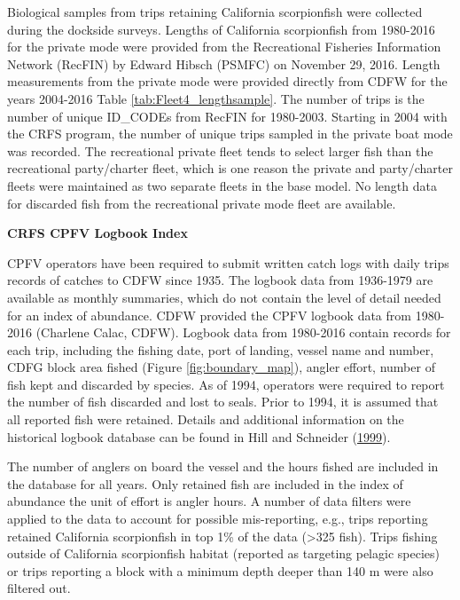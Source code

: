 \documentclass[12pt,]{article}
\begin{document}
Biological samples from trips retaining California scorpionfish were
collected during the dockside surveys. Lengths of California
scorpionfish from 1980-2016 for the private mode were provided from the
Recreational Fisheries Information Network (RecFIN) by Edward Hibsch
(PSMFC) on November 29, 2016. Length measurements from the private mode
were provided directly from CDFW for the years 2004-2016 Table
\ref{tab:Fleet4_lengthsample}. The number of trips is the number of
unique ID\_CODEs from RecFIN for 1980-2003. Starting in 2004 with the
CRFS program, the number of unique trips sampled in the private boat
mode was recorded. The recreational private fleet tends to select larger
fish than the recreational party/charter fleet, which is one reason the
private and party/charter fleets were maintained as two separate fleets
in the base model. No length data for discarded fish from the
recreational private mode fleet are available.

\textbf{CRFS CPFV Logbook Index}

CPFV operators have been required to submit written catch logs with
daily trips records of catches to CDFW since 1935. The logbook data from
1936-1979 are available as monthly summaries, which do not contain the
level of detail needed for an index of abundance. CDFW provided the CPFV
logbook data from 1980-2016 (Charlene Calac, CDFW). Logbook data from
1980-2016 contain records for each trip, including the fishing date,
port of landing, vessel name and number, CDFG block area fished (Figure
\ref{fig:boundary_map}), angler effort, number of fish kept and
discarded by species. As of 1994, operators were required to report the
number of fish discarded and lost to seals. Prior to 1994, it is assumed
that all reported fish were retained. Details and additional information
on the historical logbook database can be found in Hill and Schneider
(\protect\hyperlink{ref-Hill1999}{1999}).

The number of anglers on board the vessel and the hours fished are
included in the database for all years. Only retained fish are included
in the index of abundance the unit of effort is angler hours. A number
of data filters were applied to the data to account for possible
mis-reporting, e.g., trips reporting retained California scorpionfish in
top 1\% of the data (\textgreater{}325 fish). Trips fishing outside of
California scorpionfish habitat (reported as targeting pelagic species)
or trips reporting a block with a minimum depth deeper than 140 m were
also filtered out.
\end{document}

